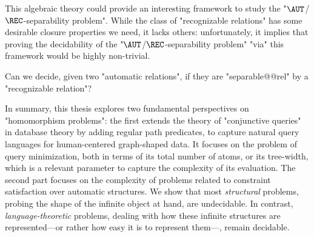 This algebraic theory could provide an interesting framework to
study the "$\AUT$/$\REC$-separability problem".
While the class of "recognizable relations" has some desirable
closure properties we need, it lacks others:
unfortunately, it implies that proving the decidability of
the "$\AUT$/$\REC$-separability problem" "via" this framework would
be highly non-trivial.

\begin{openproblemintro}
	Can we decide, given two "automatic relations", if they are "separable@@rel"
	by a "recognizable relation"?
\end{openproblemintro}

In summary, this thesis explores two fundamental perspectives on "homomorphism problems":
the first extends the theory of "conjunctive queries" in database theory by adding regular path
predicates, to capture natural query languages for human-centered graph-shaped data.
It focuses on the problem of query minimization, both in terms of
its total number of atoms, or its tree-width, which is a relevant parameter to
capture the complexity of its evaluation.
The second part focuses on the complexity of problems related to constraint satisfaction
over automatic structures. We show that most \emph{structural} problems, probing the shape of the 
infinite object at hand, are undecidable. In contrast, \emph{language-theoretic} 
problems, dealing with how these infinite structures are represented---or rather how easy it
is to represent them---, remain decidable.